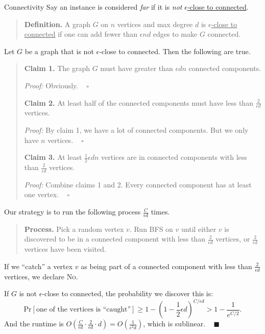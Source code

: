 \begin{solution}{Connectivity}
    Say an instance is considered \emph{far} if it is \emph{not} \underline{$\epsilon$-close to connected}.
    \begin{quote}
        \textbf{Definition.} A graph $G$ on $n$ vertices and max degree $d$ is \underline{$\epsilon$-close to connected} if one can add fewer than $\epsilon nd$ edges to make $G$ connected.
    \end{quote}
    Let $G$ be a graph that is not $\epsilon$-close to connected.  Then the following are true.
    \begin{quote}
        \textbf{Claim 1.} The graph $G$ must have greater than $\epsilon d n$ connected components.

        \emph{Proof:} Obviously. ~ $\square$

        \textbf{Claim 2.} At least half of the connected components must have less than $\frac{2}{\epsilon d}$ vertices.

        \emph{Proof:} By claim 1, we have a lot of connected components.  But we only have $n$ vertices.  ~ $\square$

        \textbf{Claim 3.} At least $\frac{1}{2} \epsilon d n$ vertices are in connected components with less than $\frac{2}{\epsilon d}$ vertices.

        \emph{Proof:} Combine claims 1 and 2.  Every connected component has at least one vertex. ~ $\square$
    \end{quote}
    Our strategy is to run the following process $\frac{C}{\epsilon d}$ times.
\begin{quote}
    \textbf{Process.} Pick a random vertex $v$.  Run BFS on $v$ until either $v$ is discovered to be in a connected component with less than $\frac{2}{\epsilon d}$ vertices, or $\frac{2}{\epsilon d}$ vertices have been visited.
\end{quote}
    If we ``catch'' a vertex $v$ as being part of a connected component with less than $\frac{2}{\epsilon d}$ vertices, we declare \textsc{No}.
    
    If $G$ is not $\epsilon$-close to connected, the probability we discover this is:
    \[ \mathrm{Pr}[\text{one of the vertices is ``caught''}] \geq 1 - \left( 1 - \dfrac{1}{2}\epsilon d \right)^{C/\epsilon d} > 1 - \dfrac{1}{e^{C/2}}. \]
    And the runtime is $O\left(\frac{C}{\epsilon d} \cdot \frac{2}{\epsilon d} \cdot d\right) = O\left(\frac{1}{\epsilon^2 d}\right)$, which is sublinear. ~ $\blacksquare$
\end{solution}


